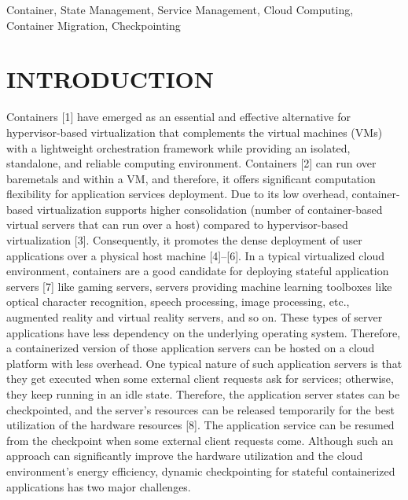 \documentclass[conference]{IEEEtran}
\begin{document}
\begin{IEEEkeywords}
Container, State Management, Service Management, Cloud Computing, Container Migration, Checkpointing
\end{IEEEkeywords}

\section{INTRODUCTION}
Containers [1] have emerged as an essential and effective alternative for hypervisor-based virtualization that complements
the virtual machines (VMs) with a lightweight orchestration
framework while providing an isolated, standalone, and reliable computing environment. Containers [2] can run over baremetals and within a VM, and therefore, it offers significant
computation flexibility for application services deployment.
Due to its low overhead, container-based virtualization supports higher consolidation (number of container-based virtual
servers that can run over a host) compared to hypervisor-based
virtualization [3]. Consequently, it promotes the dense deployment of user applications over a physical host machine [4]–[6].
In a typical virtualized cloud environment, containers are a
good candidate for deploying stateful application servers [7]
like gaming servers, servers providing machine learning toolboxes like optical character recognition, speech processing,
image processing, etc., augmented reality and virtual reality
servers, and so on. These types of server applications have less dependency on the underlying operating system. Therefore,
a containerized version of those application servers can be
hosted on a cloud platform with less overhead. One typical
nature of such application servers is that they get executed
when some external client requests ask for services; otherwise,
they keep running in an idle state. Therefore, the application
server states can be checkpointed, and the server’s resources
can be released temporarily for the best utilization of the
hardware resources [8]. The application service can be resumed from the checkpoint when some external client requests
come. Although such an approach can significantly improve
the hardware utilization and the cloud environment’s energy
efficiency, dynamic checkpointing for stateful containerized
applications has two major challenges.
\end{document}
